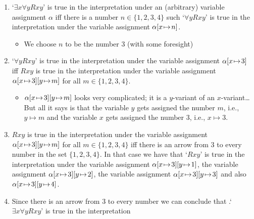  \begin{enumerate}
 \item  `$\exists x\forall y Rxy$' is true in the interpretation under an (arbitrary) variable assignment $\alpha$ iff there is a number $n\in\{1,2,3,4\}$ such `$\forall y Rxy$' is true in the interpretation under the variable assignment $\alpha[x \!\mapsto\! n]$. 
 \begin{itemize}
 \item We choose $n$ to be the number 3 (with some foresight)
 \end{itemize}
 \item `$\forall y Rxy$' is true in the interpretation under the variable assignment $\alpha[x \!\mapsto\! 3]$ iff $Rxy$ is true in the interpretation under the variable assignment $\alpha[x \!\mapsto\! 3][y \!\mapsto\! m]$ for all $m\in\{1,2,3,4\}$.
 \begin{itemize}
 \item $\alpha[x \!\mapsto\! 3][y \!\mapsto\! m]$ looks very complicated; it is a $y$-variant of an $x$-variant\ldots But all it says is that the variable $y$ gets assigned the number $m$, i.e., $y\mapsto m$ and the variable $x$ gets assigned the number $3$, i.e., $x\mapsto 3$.
 \end{itemize}
 \item $Rxy$ is true in the interpretation under the variable assignment $\alpha[x \!\mapsto\! 3][y \!\mapsto\! m]$ for all $m\in\{1,2,3,4\}$ iff there is an arrow from $3$ to every number in the set $\{1,2,3,4\}$. In that case we have that `$Rxy$' is true in the interpretation under the variable assignment $\alpha[x \!\mapsto\! 3][y \!\mapsto\! 1]$, the variable assignment $\alpha[x \!\mapsto\! 3][y \!\mapsto\! 2]$, the variable assignment $\alpha[x \!\mapsto\! 3][y \!\mapsto\! 3]$ and also $\alpha[x \!\mapsto\! 3][y \!\mapsto\! 4]$.
 \item Since there is an arrow from 3 to every number we can conclude that .`$\exists x\forall y Rxy$' is true in the interpretation
 \end{enumerate}
 
